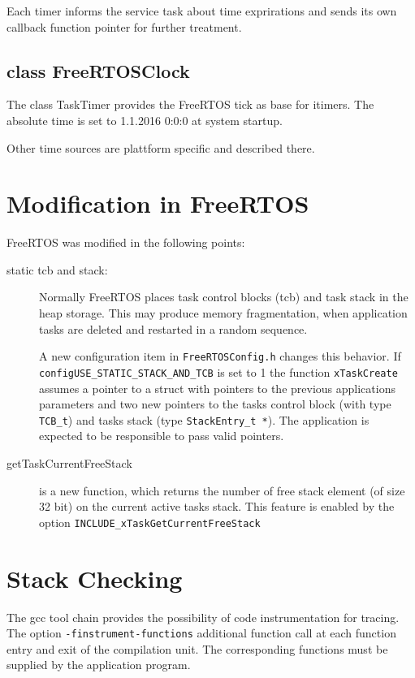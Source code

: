 Each timer informs the service task about time exprirations and 
sends its own callback function pointer for further treatment.

\subsection{class FreeRTOSClock}
The class TaskTimer provides the FreeRTOS tick as
base for itimers.
The absolute time is set to 1.1.2016 0:0:0 at system startup.

Other time sources are plattform specific and described there.

\section{Modification in FreeRTOS}
FreeRTOS was modified in the following points:
\begin{description}
\item[static tcb and stack:]  Normally FreeRTOS places task control blocks (tcb)
   and task stack in the heap storage. This may produce memory fragmentation,
   when application tasks are deleted and restarted in a random sequence.

   A new configuration item in \texttt{FreeRTOSConfig.h}  changes this
   behavior. If \texttt{configUSE\_STATIC\_STACK\_AND\_TCB} is set to 1
   the function \texttt{xTaskCreate} assumes a pointer to a struct with
   pointers to the previous applications parameters and two new pointers
   to the tasks control block (with type \texttt{TCB\_t}) and tasks stack
   (type \texttt{StackEntry\_t *}). The application is expected to be
   responsible to pass valid pointers.
\item[getTaskCurrentFreeStack] is a new function, which returns the number
   of free stack element (of size 32 bit) on the current active tasks stack.
   This feature is enabled by the option
    \texttt{INCLUDE\_xTaskGetCurrentFreeStack}
\end{description}

\section{Stack Checking}
The gcc tool chain provides the possibility of code instrumentation
for tracing. The option \texttt{-finstrument-functions} additional
function call at each function entry and exit of the compilation unit.
The corresponding functions must be supplied by the application program.

